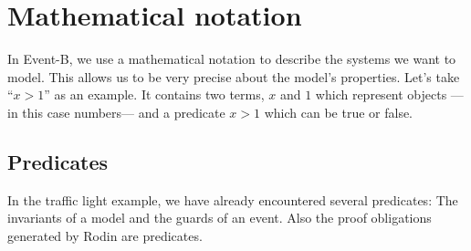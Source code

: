 \newcommand{\lascii}[1]{\qquad\quad \textrm{ASCII: } \texttt{#1}}
\newcommand{\inascii}[1]{(ASCII: \texttt{#1})}

\section{Mathematical notation}
\label{tutorial_04}
In Event-B, we use a mathematical notation to describe the systems we want to model.
This allows us to be very precise about the model's properties.
Let's take ``$x>1$'' as an example. It contains two terms, $x$ and $1$ which represent objects
---in this case numbers--- and a predicate $x>1$ which can be true or false. 

\subsection{Predicates}
\label{tut04:predicates}
In the traffic light example, we have already encountered several predicates: The invariants of
a model and the guards of an event. Also the proof obligations generated by Rodin are
predicates.

